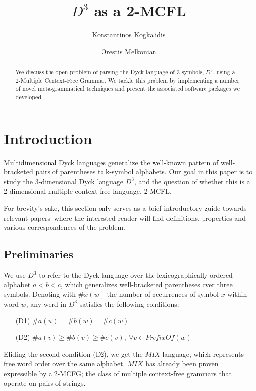 \documentclass{llncs}
\title{$D^3$ as a 2-MCFL}
\begin{document}
\author{Konstantinos Kogkalidis \and Orestis Melkonian}

\maketitle
\begin{abstract}
We discuss the open problem of parsing the Dyck language of 3 symbols, $D^3$, using a 2-Multiple Context-Free Grammar. We tackle this problem by implementing a number of novel meta-grammatical techniques and present the associated software packages we developed.

\end{abstract}

\section{Introduction}\label{sec1}
Multidimensional Dyck languages\cite{moortgat} generalize the well-known pattern of well-bracketed pairs of parentheses to k-symbol alphabets. Our goal in this paper is to study the 3-dimensional Dyck language $D^3$, and the question of whether this is a 2-dimensional multiple context-free language, 2-MCFL.

For brevity's sake, this section only serves as a brief introductory guide towards relevant papers, where the interested reader will find definitions, properties and various correspondences of the problem. 

\subsection{Preliminaries}
We use $D^3$ to refer to the Dyck language over the lexicographically ordered alphabet $a < b < c$, which generalizes well-bracketed parentheses over three symbols. Denoting with $\#x(w)$ the number of occurrences of symbol $x$ within word $w$, any word in $D^3$ satisfies the following conditions:
\begin{itemize}
\item[(D1)] $ \#a(w) = \#b(w) = \#c(w) $
\item[(D2)] $ \#a(v) \geq \#b(v) \geq \#c(v),\ \forall v \in \textit{PrefixOf}(w)$
\end{itemize}
Eliding the second condition (D2), we get the $MIX$ language, which represents free word order over the same alphabet.
$MIX$ has already been proven expressible by a 2-MCFG\cite{salvati}; the class of multiple context-free grammars that operate on pairs of strings\cite{gotzmann}.
\end{document}
